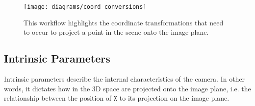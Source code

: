 \begin{figure}[H]
    \centering
    \texttt{[image: diagrams/coord\_conversions]}
    \caption{This workflow highlights the coordinate transformations that need to occur to project a point in the scene onto the image plane.}
\end{figure}

\subsection{Intrinsic Parameters} \label{sec:intrinsics}

Intrinsic parameters describe the internal characteristics of the camera. In other words, it dictates how in the 3D space are projected onto the image plane, i.e. the relationship between the position of $\mathtt{X}$ to its projection on the image plane.

